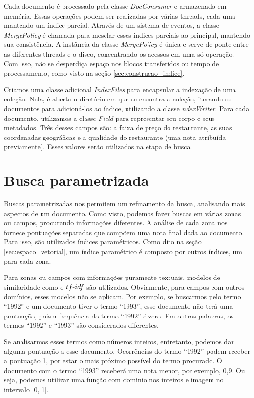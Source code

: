 Cada documento é processado pela classe \emph{DocConsumer} e armazenado em memória. Essas operações podem ser realizadas por várias threads, cada uma mantendo um índice parcial. Através de um sistema de eventos, a classe \emph{MergePolicy} é chamada para mesclar esses índices parciais ao principal, mantendo sua consistência. A instância da classe \emph{MergePolicy} é única e serve de ponte entre as diferentes threads e o disco, concentrando os acessos em uma só operação. Com isso, não se desperdiça espaço nos blocos transferidos ou tempo de processamento, como visto na seção \ref{sec:construcao_indice}. 

Criamos uma classe adicional \emph{IndexFiles} para encapsular a indexação de uma coleção. Nela, é aberto o diretório em que se encontra a coleção, iterando os documentos para adicioná-los ao índice, utilizando a classe \emph{ndexWriter}. Para cada documento, utilizamos a classe \emph{Field} para representar seu corpo e seus metadados. Três desses campos são: a faixa de preço do restaurante, as suas coordenadas geográficas e a qualidade do restaurante (uma nota atribuída previamente). Esses valores serão utilizados na etapa de busca.

\section{Busca parametrizada}
\label{sec:busca_parametrizada}

Buscas parametrizadas nos permitem um refinamento da busca, analisando mais aspectos de um documento. Como visto, podemos fazer buscas em várias zonas ou campos, procurando informações diferentes. A análise de cada zona nos fornece pontuações separadas que compõem uma nota final dada ao documento. Para isso, são utilizados índices paramétricos. Como dito na seção \ref{sec:espaco_vetorial}, um índice paramétrico é composto por outros índices, um para cada zona.

Para zonas ou campos com informações puramente textuais, modelos de similaridade como o $tf\textnormal{-}idf$ são utilizados. Obviamente, para campos com outros domínios, esses modelos não se aplicam. Por exemplo, se buscarmos pelo termo ``1992'' e um documento tiver o termo ``1993'', esse documento não terá uma pontuação, pois a frequência do termo ``1992'' é zero.  Em outras palavras, os termos ``1992'' e ``1993'' são considerados diferentes.

Se analisarmos esses termos como números inteiros, entretanto, podemos dar alguma pontuação a esse documento. Ocorrências do termo ``1992'' podem receber a pontuação 1, por estar o mais próximo possível do termo procurado. O documento com o termo ``1993'' receberá uma nota menor, por exemplo, 0,9. Ou seja, podemos utilizar uma função com domínio nos inteiros e imagem no intervalo [0, 1].

